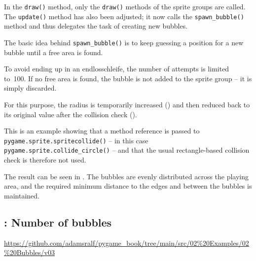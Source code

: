
In the \texttt{draw()} method, only the \texttt{draw()} methods of the sprite groups are called. The \texttt{update()} method has also been adjusted; it now calls the \texttt{spawn\_bubble()} method and thus delegates the task of creating new bubbles.


The basic idea behind \texttt{spawn\_bubble()} is to keep guessing a position for a new bubble until a free area is found.
\begin{warningbox}
	To avoid ending up in an \gls{endlosschleife}, the number of attempts is limited to~100. If no free area is found, the bubble is not added to the sprite group -- it is simply discarded.
\end{warningbox}

For this purpose, the radius is temporarily increased () and then reduced back to its original value after the collision check (). 

This is an example showing that a method reference is passed to \texttt{pygame.sprite\-.sprite\-collide()} -- in this case \texttt{pygame.sprite.collide\_circle()} -- and that the usual rectangle-based collision check is therefore not used.


The result can be seen in . The bubbles are evenly distributed across the playing area, and the required minimum distance to the edges and between the bubbles is maintained.


\subsection{: Number of bubbles}
\begin{diskbox}
	\url{https://github.com/adamsralf/pygame_book/tree/main/src/02%20Examples/02%20Bubbles/v03}
\end{diskbox}

